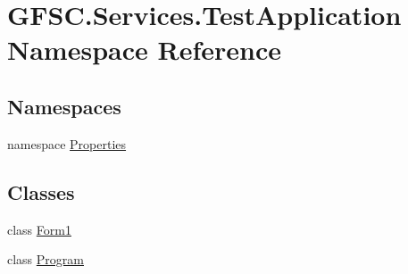 \hypertarget{namespace_g_f_s_c_1_1_services_1_1_test_application}{}\section{G\+F\+S\+C.\+Services.\+Test\+Application Namespace Reference}
\label{namespace_g_f_s_c_1_1_services_1_1_test_application}
\subsection*{Namespaces}
\begin{DoxyCompactItemize}
\item 
namespace \mbox{\hyperlink{namespace_g_f_s_c_1_1_services_1_1_test_application_1_1_properties}{Properties}}
\end{DoxyCompactItemize}
\subsection*{Classes}
\begin{DoxyCompactItemize}
\item 
class \mbox{\hyperlink{class_g_f_s_c_1_1_services_1_1_test_application_1_1_form1}{Form1}}
\item 
class \mbox{\hyperlink{class_g_f_s_c_1_1_services_1_1_test_application_1_1_program}{Program}}
\end{DoxyCompactItemize}
